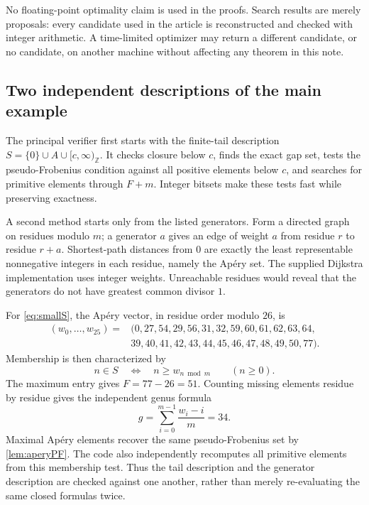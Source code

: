 \documentclass[11pt,letterpaper]{article}
\numberwithin{equation}{section}
\theoremstyle{definition}
\theoremstyle{remark}
\newcommand{\Z}{\mathbb Z}
\newcommand{\tail}[1]{[#1,\infty)_{\Z}}
\begin{document}
No floating-point optimality claim is used in the proofs. Search results
are merely proposals: every candidate used in the article is reconstructed
and checked with integer arithmetic. A time-limited optimizer may return a
different candidate, or no candidate, on another machine without affecting
any theorem in this note.

\subsection{Two independent descriptions of the main example}

The principal verifier first starts with the finite-tail description
$S=\{0\}\cup A\cup\tail c$. It checks closure below $c$, finds the exact
gap set, tests the pseudo-Frobenius condition against all positive elements
below $c$, and searches for primitive elements through $F+m$.
Integer bitsets make these tests fast while preserving exactness.

A second method starts only from the listed generators. Form a directed
graph on residues modulo $m$; a generator $a$ gives an edge of weight $a$
from residue $r$ to residue $r+a$. Shortest-path distances from $0$ are
exactly the least representable nonnegative integers in each residue,
namely the Ap\'ery set. The supplied Dijkstra implementation uses integer
weights. Unreachable residues would reveal that the generators do not
have greatest common divisor $1$.

For \eqref{eq:smallS}, the Ap\'ery vector, in residue order modulo $26$, is
\begin{equation}\label{eq:smallapery}
\begin{split}
 (w_0,\ldots,w_{25})={}&(0,27,54,29,56,31,32,59,60,61,62,63,64,\\
 &39,40,41,42,43,44,45,46,47,48,49,50,77).
\end{split}
\end{equation}
Membership is then characterized by
\[
 n\in S\quad\Longleftrightarrow\quad n\ge w_{n\bmod m}
 \qquad(n\ge0).
\]
The maximum entry gives $F=77-26=51$. Counting missing elements residue
by residue gives the independent genus formula
\[
 g=\sum_{i=0}^{m-1}\frac{w_i-i}{m}=34.
\]
Maximal Ap\'ery elements recover the same pseudo-Frobenius set by
\cref{lem:aperyPF}. The code also independently recomputes all primitive
elements from this membership test. Thus the tail description and the
generator description are checked against one another, rather than merely
re-evaluating the same closed formulas twice.
\end{document}
